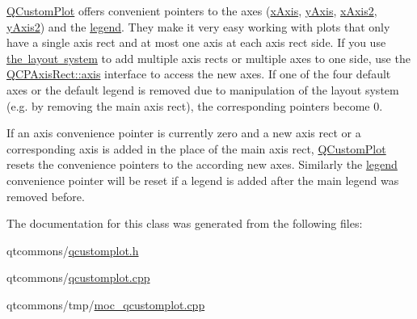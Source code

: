 \mbox{\hyperlink{class_q_custom_plot}{Q\+Custom\+Plot}} offers convenient pointers to the axes (\mbox{\hyperlink{class_q_custom_plot_a9a79cd0158a4c7f30cbc702f0fd800e4}{x\+Axis}}, \mbox{\hyperlink{class_q_custom_plot_af6fea5679725b152c14facd920b19367}{y\+Axis}}, \mbox{\hyperlink{class_q_custom_plot_ada41599f22cad901c030f3dcbdd82fd9}{x\+Axis2}}, \mbox{\hyperlink{class_q_custom_plot_af13fdc5bce7d0fabd640f13ba805c0b7}{y\+Axis2}}) and the \mbox{\hyperlink{class_q_custom_plot_a4eadcd237dc6a09938b68b16877fa6af}{legend}}. They make it very easy working with plots that only have a single axis rect and at most one axis at each axis rect side. If you use \mbox{\hyperlink{}{the layout system}} to add multiple axis rects or multiple axes to one side, use the \mbox{\hyperlink{class_q_c_p_axis_rect_a583ae4f6d78b601b732183f6cabecbe1}{Q\+C\+P\+Axis\+Rect\+::axis}} interface to access the new axes. If one of the four default axes or the default legend is removed due to manipulation of the layout system (e.\+g. by removing the main axis rect), the corresponding pointers become 0.

If an axis convenience pointer is currently zero and a new axis rect or a corresponding axis is added in the place of the main axis rect, \mbox{\hyperlink{class_q_custom_plot}{Q\+Custom\+Plot}} resets the convenience pointers to the according new axes. Similarly the \mbox{\hyperlink{class_q_custom_plot_a4eadcd237dc6a09938b68b16877fa6af}{legend}} convenience pointer will be reset if a legend is added after the main legend was removed before. 

The documentation for this class was generated from the following files\+:\begin{DoxyCompactItemize}
\item 
qtcommons/\mbox{\hyperlink{qcustomplot_8h}{qcustomplot.\+h}}\item 
qtcommons/\mbox{\hyperlink{qcustomplot_8cpp}{qcustomplot.\+cpp}}\item 
qtcommons/tmp/\mbox{\hyperlink{moc__qcustomplot_8cpp}{moc\+\_\+qcustomplot.\+cpp}}\end{DoxyCompactItemize}

